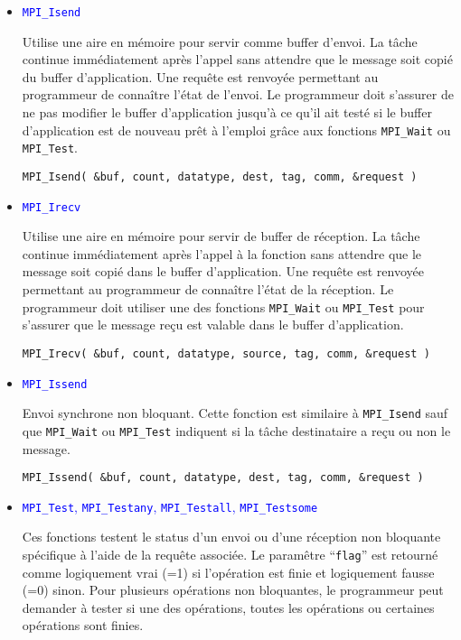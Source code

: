 \documentclass[11pt,a4paper]{article}
\begin{document}
\begin{itemize}
\item \textcolor{blue}{\texttt{MPI\_Isend}}

Utilise une aire en mémoire pour servir comme buffer d'envoi. La tâche continue
immédiatement après l'appel sans attendre que le message soit copié du
buffer d'application. Une requête est renvoyée permettant au programmeur de
connaître l'état de l'envoi. Le programmeur doit s'assurer de ne pas modifier
le buffer d'application jusqu'à ce qu'il ait testé si le buffer d'application
est de nouveau prêt à l'emploi grâce aux fonctions \texttt{MPI\_Wait} ou
\texttt{MPI\_Test}.

\begin{lstlisting}[style=customcpp]
MPI_Isend( &buf, count, datatype, dest, tag, comm, &request )
\end{lstlisting}

\item \textcolor{blue}{\texttt{MPI\_Irecv}}

Utilise une aire en mémoire pour servir de buffer de réception. La tâche continue
immédiatement après l'appel à la fonction sans attendre que le message soit copié
dans le buffer d'application. Une requête est renvoyée permettant au programmeur
de connaître l'état de la réception. Le programmeur doit utiliser une des
fonctions \texttt{MPI\_Wait} ou \texttt{MPI\_Test} pour s'assurer que le message
reçu est valable dans le buffer d'application.

\begin{lstlisting}[style=customcpp]
MPI_Irecv( &buf, count, datatype, source, tag, comm, &request )
\end{lstlisting}

\item \textcolor{blue}{\texttt{MPI\_Issend}}

Envoi synchrone non bloquant. Cette fonction est similaire à \texttt{MPI\_Isend}
sauf que \texttt{MPI\_Wait} ou \texttt{MPI\_Test} indiquent si la tâche destinataire
a reçu ou non le message.

\begin{lstlisting}[style=customcpp]
MPI_Issend( &buf, count, datatype, dest, tag, comm, &request )
\end{lstlisting}

\item \textcolor{blue}{\texttt{MPI\_Test}, \texttt{MPI\_Testany}, \texttt{MPI\_Testall}, \texttt{MPI\_Testsome}}

Ces fonctions testent le status d'un envoi ou d'une réception non bloquante spécifique à l'aide de la requête associée. 
Le paramêtre ``\texttt{flag}'' est retourné
comme logiquement vrai (=1) si l'opération est finie et logiquement fausse (=0) sinon. Pour plusieurs opérations non
bloquantes, le programmeur peut demander à tester si une des opérations, toutes les opérations ou certaines opérations
sont finies.


\end{itemize}
\end{document}
